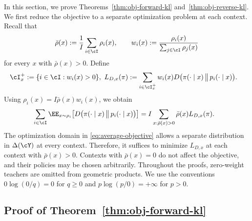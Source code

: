\documentclass[11pt]{article}
\begin{document}
In this section, we prove Theorems~\ref{thm:obj-forward-kl}
and~\ref{thm:obj-reverse-kl}. We first reduce the objective to a
separate optimization problem at each context. Recall that
\begin{align*}
    \bar\rho(x):=\frac1I\sum_{i\in\cI}\rho_i(x),
    \qquad
    w_i(x):=\frac{\rho_i(x)}{\sum_{j\in\cI}\rho_j(x)}
\end{align*}
for every $x$ with $\bar\rho(x)>0$. Define
\begin{align*}
    \cI_x^+&:=\{i\in\cI:w_i(x)>0\}, \ 
    L_{D,x}(\pi):=\sum_{i\in\cI_x^+}w_i(x)
    D\bigl(\pi(\cdot\mid x)\,\big\|\,p_i(\cdot\mid x)\bigr).
\end{align*}
Using $\rho_i(x)=I\bar\rho(x)w_i(x)$, we obtain
\begin{align}
    &\sum_{i\in\cI}\EE_{x\sim\rho_i}
    \bigl[D\bigl(\pi(\cdot\mid x)\,\big\|\,p_i(\cdot\mid x)\bigr)\bigr] =I\sum_{x:\bar\rho(x)>0}\bar\rho(x)L_{D,x}(\pi).
    \label{eq:agg-proof-context-reduction}
\end{align}
The optimization domain in \eqref{eq:average-objective} allows a
separate distribution in $\Delta(\cY)$ at every context. Therefore,
it suffices to minimize $L_{D,x}$ at each context with
$\bar\rho(x)>0$. Contexts with $\bar\rho(x)=0$ do not affect the
objective, and their policies may be chosen arbitrarily.
Throughout the proofs, zero-weight teachers are omitted from
geometric products. We use the conventions $0\log(0/q)=0$
for $q\geq0$ and $p\log(p/0)=+\infty$ for $p>0$.

\subsection{Proof of Theorem~\ref{thm:obj-forward-kl}}
\label{app:proof-obj-forward-kl}
\end{document}
